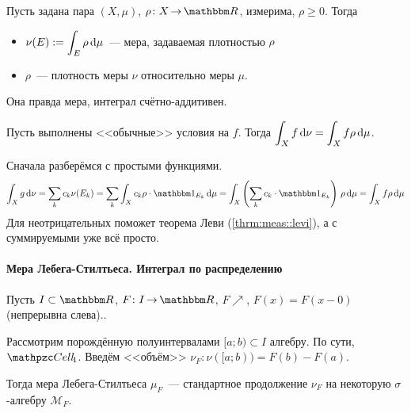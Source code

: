 \documentclass[draft, timbord]{longnotes}
\begin{document}
\begin{defn}\label{defn:meas::discint::dens}
  Пусть задана пара  
  $(X, \mu)$, $\rho \colon X \to \R$, измерима, $\rho \geqslant 0$. 
  Тогда 
  \begin{itemize}
    \item $\displaystyle \nu(E) := \int_E \rho \, \mathrm{d} \mu $~--- мера, задаваемая плотностью
      $\rho$
    \item $\rho$~--- плотность меры $\nu$ относительно меры $\mu$.
  \end{itemize}
\end{defn}

\begin{rem*}
  Она правда мера, интеграл счётно-аддитивен.
\end{rem*}

\begin{thrm}\label{thrm:meas::discint::intchg}
  Пусть выполнены <<обычные>> условия на $f$. Тогда 
  $\displaystyle \int_X f \, \mathrm{d} \nu = \int_X f \rho \, \mathrm{d} \mu$.
\end{thrm}
\begin{tproof}
  Сначала разберёмся с простыми функциями. \[
    \int_X g \, \del \nu =  \sum_k c_k \nu (E_k)
    = \sum_k \int_X c_k \rho \cdot \ind_{E_k}\, \del \mu
    = \int_X \left(\sum_k c_k \cdot \ind_{E_k}\right)\, \rho \, \del \mu
    = \int_X f \rho \, \del \mu 
  \]
  Для неотрицательных поможет теорема Леви (\ref{thrm:meas::levi}), 
  а с суммируемыми уже всё просто.
\end{tproof}

\paragraph{Мера Лебега-Стилтьеса. Интеграл по распределению}
\label{par:meas::lebstil}

\begin{defn}\label{defn:meas::lebstil::meas}
  Пусть $I \subset \R$, $F \colon I \to \R$, $F \nearrow$, $F(x) = F(x-0)$ 
  (непрерывна слева).\note{А можно и без. Тогда $\nu([a;b)) = F(b-0) - F(a-0)$,
  см.~\ref{makpodk}}.

  Рассмотрим порождённую полуинтервалами $[a;b) \subset I$ алгебру.
  По сути, $\Cell_1$.
  Введём <<объём>> $\nu_F \colon \nu([a;b)) = F(b) - F(a)$.
  
  Тогда мера Лебега-Стилтьеса $\mu_F$~--- стандартное продолжение $\nu_F$ на некоторую
  $\sigma$-алгебру $\mathcal M_F$.
\end{defn}
\end{document}
